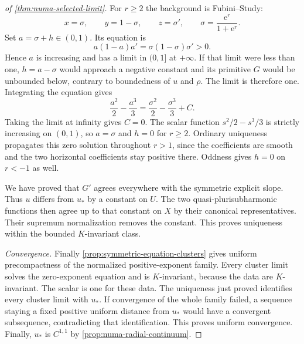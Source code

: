 \begin{proof}[of \cref{thm:numa-selected-limit}]
For $r\geq2$ the background is Fubini--Study:
\[
 x=\sigma,\qquad y=1-\sigma,\qquad z=\sigma',
 \qquad \sigma=\frac{\mathrm{e}^r}{1+\mathrm{e}^r}.
\]
Set $a=\sigma+h\in(0,1)$. Its equation is
\[
 a(1-a)a'=\sigma(1-\sigma)\sigma'>0.
\]
Hence $a$ is increasing and has a limit in $(0,1]$ at $+\infty$. If that limit were less than one, $h=a-\sigma$ would approach a negative constant and its primitive $G$ would be unbounded below, contrary to boundedness of $u$ and $\rho$. The limit is therefore one. Integrating the equation gives
\[
 \frac{a^2}{2}-\frac{a^3}{3}
  =\frac{\sigma^2}{2}-\frac{\sigma^3}{3}+C.
\]
Taking the limit at infinity gives $C=0$. The scalar function $s^2/2-s^3/3$ is strictly increasing on $(0,1)$, so $a=\sigma$ and $h=0$ for $r\geq2$. Ordinary uniqueness propagates this zero solution throughout $r>1$, since the coefficients are smooth and the two horizontal coefficients stay positive there. Oddness gives $h=0$ on $r<-1$ as well.

We have proved that $G'$ agrees everywhere with the symmetric explicit slope. Thus $u$ differs from $u_*$ by a constant on $U$. The two quasi-plurisubharmonic functions then agree up to that constant on $X$ by their canonical representatives. Their supremum normalization removes the constant. This proves uniqueness within the bounded $K$-invariant class.

\emph{Convergence.} Finally \cref{prop:symmetric-equation-clusters} gives uniform precompactness of the normalized positive-exponent family. Every cluster limit solves the zero-exponent equation and is $K$-invariant, because the data are $K$-invariant. The scalar is one for these data. The uniqueness just proved identifies every cluster limit with $u_*$. If convergence of the whole family failed, a sequence staying a fixed positive uniform distance from $u_*$ would have a convergent subsequence, contradicting that identification. This proves uniform convergence. Finally, $u_*$ is $C^{1,1}$ by \cref{prop:numa-radial-continuum}.
\end{proof}
